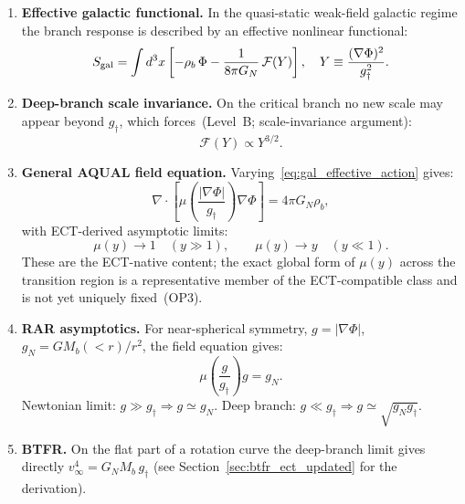\documentclass[11pt,a4paper]{article}
\numberwithin{equation}{section}
\begin{document}
\begin{enumerate}[label=(\Roman*)]
\item \textbf{Effective galactic functional.}
  In the quasi-static weak-field galactic regime the branch response
  is described by an effective nonlinear functional:
  \begin{equation}
    S_{\rm gal}=\int d^3x
    \left[-\rho_b\,\Phi
    -\frac{1}{8\pi G_N}\,\mathcal{F}(Y)\right],\quad
    Y\equiv\frac{(\nabla\Phi)^2}{g_\dagger^2}.
    \label{eq:gal_effective_action}
  \end{equation}

\item \textbf{Deep-branch scale invariance.}
  On the critical branch no new scale may appear beyond $g_\dagger$,
  which forces~(Level~B; scale-invariance argument):
  \begin{equation}
    \mathcal{F}(Y)\propto Y^{3/2}.
    \label{eq:F_deep}
  \end{equation}

\item \textbf{General AQUAL field equation.}
  Varying~\eqref{eq:gal_effective_action} gives:
  \begin{equation}
    \nabla\!\cdot\!\left[
      \mu\!\left(\frac{|\nabla\Phi|}{g_\dagger}\right)\nabla\Phi
    \right]=4\pi G_N\rho_b,
    \label{eq:ect_aqual_main}
  \end{equation}
  with ECT-derived asymptotic limits:
  \begin{equation}
    \mu(y)\to 1\quad(y\gg1),\qquad
    \mu(y)\to y\quad(y\ll1).
    \label{eq:mu_asymptotics_main}
  \end{equation}
  These are the ECT-native content; the exact global form of $\mu(y)$
  across the transition region is a representative member of the
  ECT-compatible class and is not yet uniquely fixed~(OP3).

\item \textbf{RAR asymptotics.}
  For near-spherical symmetry, $g=|\nabla\Phi|$,
  $g_N=GM_b(<r)/r^2$, the field equation gives:
  \begin{equation}
    \mu\!\left(\frac{g}{g_\dagger}\right)g=g_N.
    \label{eq:rar_algebraic}
  \end{equation}
  Newtonian limit: $g\gg g_\dagger\Rightarrow g\simeq g_N$.
  Deep branch: $g\ll g_\dagger\Rightarrow g\simeq\sqrt{g_N g_\dagger}$.

\item \textbf{BTFR.}
  On the flat part of a rotation curve the deep-branch limit gives
  directly $v_\infty^4=G_N M_b\,g_\dagger$
  (see Section~\ref{sec:btfr_ect_updated} for the derivation).


\end{enumerate}
\end{document}
